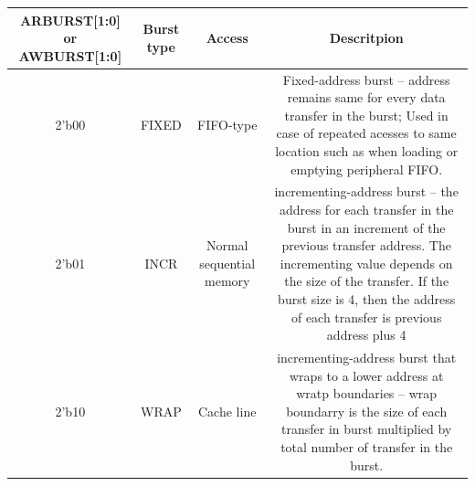 \documentclass{article}
\begin{document}
\begin{table}[H]
    \centering
    \begin{adjustbox}{max width=0.9\textwidth}
        \begin{tabular}{c|c|c|c}
            \textbf{ARBURST[1:0] or AWBURST[1:0]} & \textbf{Burst type} & \textbf{Access}          & \textbf{Descritpion}                                                                                                                                                                                                                                                        \\
            \hline
            2'b00                                 & FIXED               & FIFO-type                & Fixed-address burst -- address remains same for every data transfer in the burst; Used in case of repeated acesses to same location such as when loading or emptying  peripheral FIFO.                                                                                      \\
            2'b01                                 & INCR                & Normal sequential memory & incrementing-address burst -- the address for each transfer in the burst in an increment of the previous transfer address. The incrementing value depends on the size of the transfer. If the burst size is 4, then the address of each transfer is previous address plus 4 \\
            2'b10                                 & WRAP                & Cache line               & incrementing-address burst that wraps to a lower address at wratp boundaries -- wrap boundarry is the size of each transfer in burst multiplied by total number of transfer in the burst.                                                                                   \\
            \hline
        \end{tabular}
    \end{adjustbox}
\end{table}
\end{document}
